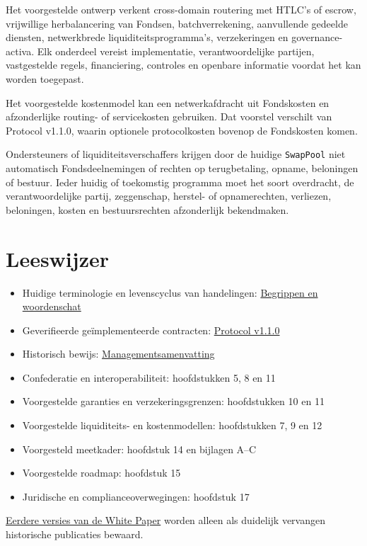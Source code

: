 \documentclass[11pt]{article}
\begin{document}
Het voorgestelde ontwerp verkent cross-domain routering met HTLC's of escrow, vrijwillige herbalancering van Fondsen, batchverrekening, aanvullende gedeelde diensten, netwerkbrede liquiditeitsprogramma's, verzekeringen en governance-activa. Elk onderdeel vereist implementatie, verantwoordelijke partijen, vastgestelde regels, financiering, controles en openbare informatie voordat het kan worden toegepast.

Het voorgestelde kostenmodel kan een netwerkafdracht uit Fondskosten en afzonderlijke routing- of servicekosten gebruiken. Dat voorstel verschilt van Protocol v1.1.0, waarin optionele protocolkosten bovenop de Fondskosten komen.

Ondersteuners of liquiditeitsverschaffers krijgen door de huidige \texttt{SwapPool} niet automatisch Fondsdeelnemingen of rechten op terugbetaling, opname, beloningen of bestuur. Ieder huidig of toekomstig programma moet het soort overdracht, de verantwoordelijke partij, zeggenschap, herstel- of opnamerechten, verliezen, beloningen, kosten en bestuursrechten afzonderlijk bekendmaken.

\section*{Leeswijzer}

\begin{itemize}[leftmargin=*]
\item Huidige terminologie en levenscyclus van handelingen: \href{https://docs.cosmolocal.credit/nl/introduction/concepts}{Begrippen en woordenschat}
\item Geverifieerde geïmplementeerde contracten: \href{https://docs.cosmolocal.credit/nl/protocol/overview}{Protocol v1.1.0}
\item Historisch bewijs: \href{https://docs.cosmolocal.credit/nl/white-paper/executive-summary}{Managementsamenvatting}
\item Confederatie en interoperabiliteit: hoofdstukken 5, 8 en 11
\item Voorgestelde garanties en verzekeringsgrenzen: hoofdstukken 10 en 11
\item Voorgestelde liquiditeits- en kostenmodellen: hoofdstukken 7, 9 en 12
\item Voorgesteld meetkader: hoofdstuk 14 en bijlagen A--C
\item Voorgestelde roadmap: hoofdstuk 15
\item Juridische en complianceoverwegingen: hoofdstuk 17
\end{itemize}
\href{https://docs.cosmolocal.credit/nl/white-paper/archive}{Eerdere versies van de White Paper} worden alleen als duidelijk vervangen historische publicaties bewaard.
\end{document}

